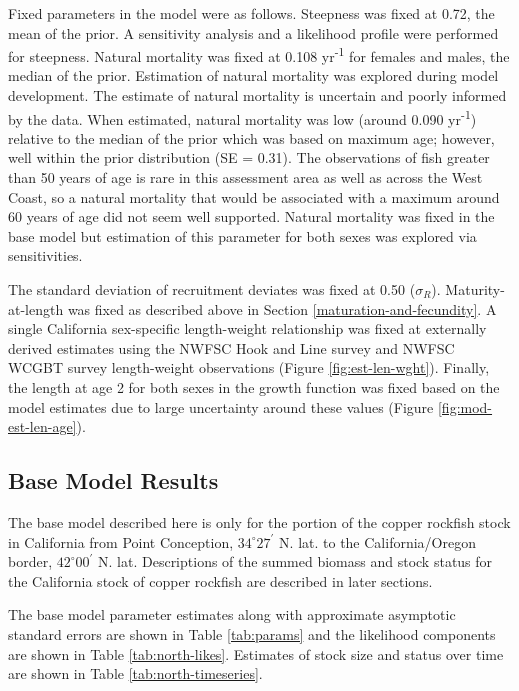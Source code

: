 \documentclass[11pt,
  english,
  letterpaper,
]{article}
\begin{document}
Fixed parameters in the model were as follows. Steepness was fixed at 0.72, the mean of the prior. A sensitivity analysis and a likelihood profile were performed for steepness. Natural mortality was fixed at 0.108 yr\textsuperscript{-1} for females and males, the median of the prior. Estimation of natural mortality was explored during model development. The estimate of natural mortality is uncertain and poorly informed by the data. When estimated, natural mortality was low (around 0.090 yr\textsuperscript{-1}) relative to the median of the prior which was based on maximum age; however, well within the prior distribution (SE = 0.31). The observations of fish greater than 50 years of age is rare in this assessment area as well as across the West Coast, so a natural mortality that would be associated with a maximum around 60 years of age did not seem well supported. Natural mortality was fixed in the base model but estimation of this parameter for both sexes was explored via sensitivities.

The standard deviation of recruitment deviates was fixed at 0.50 (\(\sigma_R\)). Maturity-at-length was fixed as described above in Section \ref{maturation-and-fecundity}. A single California sex-specific length-weight relationship was fixed at externally derived estimates using the NWFSC Hook and Line survey and NWFSC WCGBT survey length-weight observations (Figure \ref{fig:est-len-wght}). Finally, the length at age 2 for both sexes in the growth function was fixed based on the model estimates due to large uncertainty around these values (Figure \ref{fig:mod-est-len-age}).

\hypertarget{base-model-results}{%
\subsection{Base Model Results}\label{base-model-results}}

The base model described here is only for the portion of the copper rockfish stock in California from Point Conception, $34^\circ 27^\prime$ N. lat. to the California/Oregon border, $42^\circ 00^\prime$ N. lat. Descriptions of the summed biomass and stock status for the California stock of copper rockfish are described in later sections.

The base model parameter estimates along with approximate asymptotic standard errors are shown in Table \ref{tab:params} and the likelihood components are shown in Table \ref{tab:north-likes}. Estimates of stock size and status over time are shown in Table \ref{tab:north-timeseries}.
\end{document}
